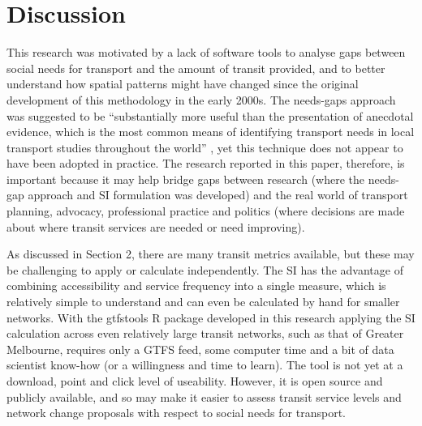\documentclass[preprint, 3p,
authoryear]{elsarticle} %
\begin{document}
\section{Discussion}\label{discussion}

This research was motivated by a lack of software tools to analyse gaps
between social needs for transport and the amount of transit provided,
and to better understand how spatial patterns might have changed since
the original development of this methodology in the early 2000s. The
needs-gaps approach was suggested to be ``substantially more useful than
the presentation of anecdotal evidence, which is the most common means
of identifying transport needs in local transport studies throughout the
world'' \citep{currie2010identifying}, yet this technique does not
appear to have been adopted in practice. The research reported in this
paper, therefore, is important because it may help bridge gaps between
research (where the needs-gap approach and SI formulation was developed)
and the real world of transport planning, advocacy, professional
practice and politics (where decisions are made about where transit
services are needed or need improving).

As discussed in Section 2, there are many transit metrics available, but
these may be challenging to apply or calculate independently. The SI has
the advantage of combining accessibility and service frequency into a
single measure, which is relatively simple to understand and can even be
calculated by hand for smaller networks. With the gtfstools R package
developed in this research applying the SI calculation across even
relatively large transit networks, such as that of Greater Melbourne,
requires only a GTFS feed, some computer time and a bit of data
scientist know-how (or a willingness and time to learn). The tool is not
yet at a download, point and click level of useability. However, it is
open source and publicly available, and so may make it easier to assess
transit service levels and network change proposals with respect to
social needs for transport.
\end{document}
